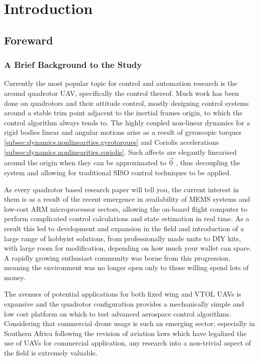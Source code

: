 \chapter{Introduction}
\label{ch:ch1}
\section{Foreward}
\label{sec:ch1.foreward}
\subsection{A Brief Background to the Study}
\label{subsec:ch1.foreward.background}
Currently the most popular topic for control and automation research is the around quadrotor UAV, specifically the control thereof. Much work has been done on quadrotors and their attitude control, mostly designing control systems around a stable trim point adjacent to the inertial frames origin, to which the control algorithm always tends to. The highly coupled non-linear dynamics for a rigid bodies linear and angular motions arise as a result of gyroscopic torques \ref{subsec:dynamics.nonlinearities.gyrotorques} and Coriolis accelerations \ref{subsec:dynamics.nonlinearities.coriolis}. Such affects are elegantly linearised around the origin when they can be approximated to $\vec{0}$ , thus decoupling the system and allowing for traditional SISO control techniques to be applied.
\par
As every quadrotor based research paper will tell you, the current interest in them is as a result of the recent emergence in availability of MEMS systems and low-cost ARM microprocessor sectors, allowing the on-board flight computer to perform complicated control calculations and state estimation in real time. As a result this led to development and expansion in the field and introduction of a large range of hobbyist solutions, from professionally made units to DIY kits, with large room for modification, depending on how much your wallet can spare. A rapidly growing enthusiast community was borne from this progression, meaning the environment was no longer open only to those willing spend lots of money.
\par
The avenues of potential applications for both fixed wing and VTOL UAVs is expansive and the quadrotor configuration provides a mechanically simple and low cost platform on which to test advanced aerospace control algorithms. Considering that commercial drone usage is such an emerging sector; especially in Southern Africa following the revision of aviation laws \cite{safedrone} which have legalized the use of UAVs for commercial application, any research into a non-trivial aspect of the field is extremely valuable. 
